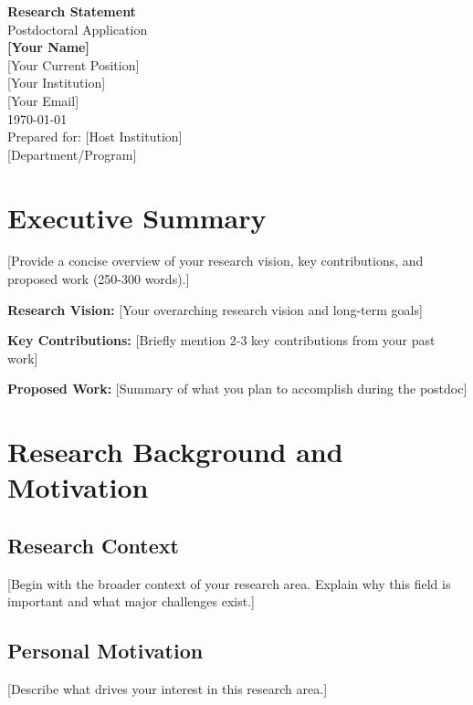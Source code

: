 \documentclass[11pt,a4paper]{article}
\begin{document}
\begin{center}
{\Large\bfseries Research Statement}\\[0.5cm]
{\large Postdoctoral Application}\\[1cm]

{\large\bfseries [Your Name]}\\[0.3cm]
{\large [Your Current Position]}\\[0.2cm]
{\large [Your Institution]}\\[0.2cm]
{\large [Your Email]}\\[0.5cm]

{\large \today}\\[1cm]

{\large Prepared for: [Host Institution]}\\[0.2cm]
{\large [Department/Program]}
\end{center}

\vspace{1cm}

\section{Executive Summary}
[Provide a concise overview of your research vision, key contributions, and proposed work (250-300 words).]

\vspace{0.5cm}
\textbf{Research Vision:} [Your overarching research vision and long-term goals]

\textbf{Key Contributions:} [Briefly mention 2-3 key contributions from your past work]

\textbf{Proposed Work:} [Summary of what you plan to accomplish during the postdoc]

\section{Research Background and Motivation}
\subsection{Research Context}
[Begin with the broader context of your research area. Explain why this field is important and what major challenges exist.]

\subsection{Personal Motivation}
[Describe what drives your interest in this research area.]
\end{document}
